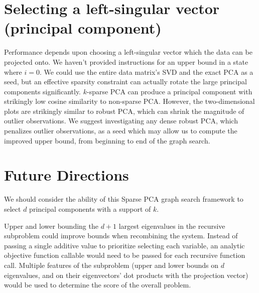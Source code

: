 \documentclass{article}
\begin{document}
\section{Selecting a left-singular vector (principal component)}

Performance depends upon choosing a left-singular vector which the data can be projected onto. We haven't provided instructions for an upper bound in a state where $i=0$. We could use the entire data matrix's SVD and the exact PCA as a seed, but an effective sparsity constraint can actually rotate the large principal components significantly. $k$-sparse PCA can produce a principal component with strikingly low cosine similarity to non-sparse PCA. However, the two-dimensional plots are strikingly similar to robust PCA, which can shrink the magnitude of outlier observations. We suggest investigating any dense robust PCA, which penalizes outlier observations, as a seed which may allow us to compute the improved upper bound, from beginning to end of the graph search.

\section{Future Directions}

We should consider the ability of this Sparse PCA graph search framework to select $d$ principal components with a support of $k$.


Upper and lower bounding the $d+1$ largest eigenvalues in the recursive subproblem could improve bounds when recombining the system. Instead of passing a single additive value to prioritize selecting each variable, an analytic objective function callable would need to be passed for each recursive function call. Multiple features of the subproblem (upper and lower bounds on $d$ eigenvalues, and on their eigenvectors' dot products with the projection vector) would be used to determine the score of the overall problem.
\end{document}
